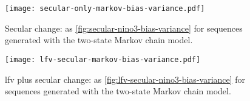 \documentclass[
  draft,
  linenumbers
]{agujournal2018}
\begin{document}
\begin{figure}
  \centering
  \texttt{[image: secular-only-markov-bias-variance.pdf]}
  \caption{
    Secular change: as \cref{fig:secular-nino3-bias-variance} for sequences generated with the two-state Markov chain model.
  }\label{fig:secular-only-markov-bias-variance}
\end{figure}

\begin{figure}
  \centering
  \texttt{[image: lfv-secular-markov-bias-variance.pdf]}
  \caption{
    \Gls{lfv} plus secular change: as \cref{fig:lfv-secular-nino3-bias-variance} for sequences generated with the two-state Markov chain model.
  }\label{fig:lfv-secular-markov-bias-variance}
\end{figure}
\end{document}

